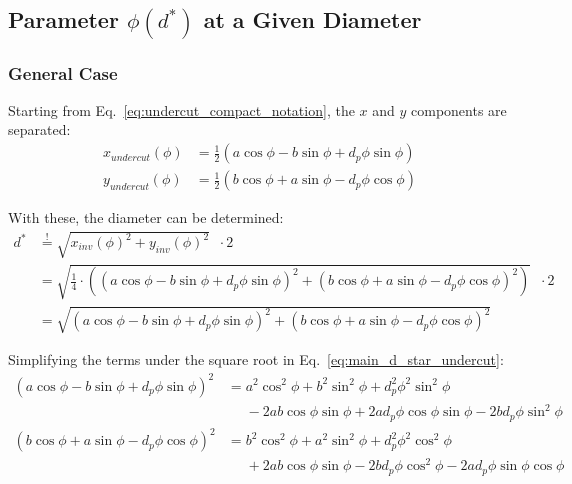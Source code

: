 \subsection{Parameter \texorpdfstring{$\phi(d^*)$}{φ(d*)} at a Given Diameter}
\subsubsection{General Case}
Starting from Eq.~\eqref{eq:undercut_compact_notation}, the $x$ and $y$ components are separated:
\begin{subequations}
\begin{align}
    x_{undercut}(\phi) &= \frac{1}{2}\left(a\cos\phi - b \sin\phi + d_p\phi\sin\phi\right) \\
    y_{undercut}(\phi) &= \frac{1}{2}\left(b\cos\phi + a \sin\phi - d_p\phi\cos\phi\right)
\end{align}
\end{subequations}

With these, the diameter can be determined:
\begin{subequations}
\begin{align}
    d^* &\stackrel{!}{=} \sqrt{x_{inv}(\phi)^2 + y_{inv}(\phi)^2} \;\;\cdot 2 \\
    &= \sqrt{\frac{1}{4}\cdot \left(\left(a\cos\phi - b \sin\phi + d_p\phi\sin\phi\right)^2
                            + \left(b\cos\phi + a \sin\phi - d_p\phi\cos\phi\right)^2\right)} \;\;\cdot 2 \\
    &= \sqrt{\left(a\cos\phi - b \sin\phi + d_p\phi\sin\phi\right)^2
           + \left(b\cos\phi + a \sin\phi - d_p\phi\cos\phi\right)^2}
\label{eq:main_d_star_undercut}
\end{align}
\end{subequations}

Simplifying the terms under the square root in Eq.~\eqref{eq:main_d_star_undercut}:
\begin{subequations}
\begin{align}
    \left(a\cos\phi - b \sin\phi + d_p\phi\sin\phi\right)^2
        &= a^2\cos^2\phi + b^2\sin^2\phi + d_p^2\phi^2\sin^2\phi \nonumber\\
        &\phantom{=} - 2ab\cos\phi\sin\phi + 2ad_p\phi\cos\phi\sin\phi - 2bd_p\phi\sin^2\phi
\\
    \left(b\cos\phi + a \sin\phi - d_p\phi\cos\phi\right)^2
        &= b^2\cos^2\phi + a^2\sin^2\phi + d_p^2\phi^2\cos^2\phi \nonumber\\
        &\phantom{=} + 2ab\cos\phi\sin\phi - 2bd_p\phi\cos^2\phi - 2ad_p\phi\sin\phi\cos\phi
\end{align}
\end{subequations}


